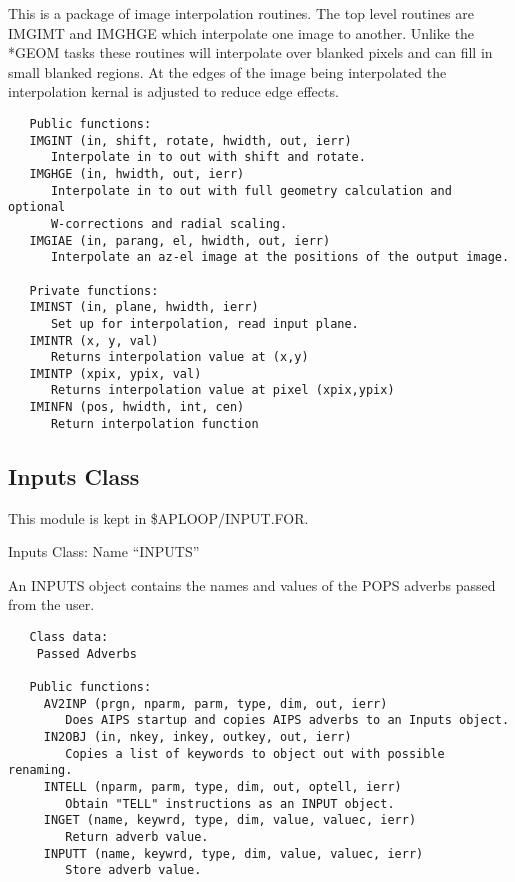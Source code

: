     This is a  package of image interpolation routines.  The top
level routines are IMGIMT and IMGHGE which interpolate one image to
another.  Unlike the *GEOM tasks these routines will  interpolate
over blanked pixels and can fill in small blanked regions.  At the
edges of the image being interpolated the interpolation kernal is
adjusted to reduce edge effects.

{\small\begin{verbatim}
   Public functions:
   IMGINT (in, shift, rotate, hwidth, out, ierr)
      Interpolate in to out with shift and rotate.
   IMGHGE (in, hwidth, out, ierr)
      Interpolate in to out with full geometry calculation and optional
      W-corrections and radial scaling.
   IMGIAE (in, parang, el, hwidth, out, ierr)
      Interpolate an az-el image at the positions of the output image.

   Private functions:
   IMINST (in, plane, hwidth, ierr)
      Set up for interpolation, read input plane.
   IMINTR (x, y, val)
      Returns interpolation value at (x,y)
   IMINTP (xpix, ypix, val)
      Returns interpolation value at pixel (xpix,ypix)
   IMINFN (pos, hwidth, int, cen)
      Return interpolation function
\end{verbatim}}

\subsection{Inputs Class}

   This module is kept in \$APLOOP/INPUT.FOR.

   Inputs Class: Name ``INPUTS''

   An INPUTS object contains the names and values of the POPS adverbs
passed from the user.


{\small\begin{verbatim}
   Class data:
    Passed Adverbs

   Public functions:
     AV2INP (prgn, nparm, parm, type, dim, out, ierr)
        Does AIPS startup and copies AIPS adverbs to an Inputs object.
     IN2OBJ (in, nkey, inkey, outkey, out, ierr)
        Copies a list of keywords to object out with possible renaming.
     INTELL (nparm, parm, type, dim, out, optell, ierr)
        Obtain "TELL" instructions as an INPUT object.
     INGET (name, keywrd, type, dim, value, valuec, ierr)
        Return adverb value.
     INPUTT (name, keywrd, type, dim, value, valuec, ierr)
        Store adverb value.
\end{verbatim}}

